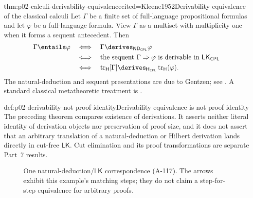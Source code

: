 \begin{hbtheorem}{thm:p02-calculi-derivability-equivalence}{cited=Kleene1952}{Derivability equivalence of the classical calculi}
Let \(\Gamma\) be a finite set of full-language propositional formulas and
let \(\varphi\) be a full-language formula.  View \(\Gamma\) as a multiset
with multiplicity one when it forms a sequent antecedent.  Then
\[
\begin{aligned}
 \Gamma\entails\varphi
 &\quad\Longleftrightarrow\quad
 \Gamma\derives_{\mathsf{ND}_{\mathsf{CPL}}}\varphi\\
 &\quad\Longleftrightarrow\quad
 \text{the sequent }\Gamma\Rightarrow\varphi
   \text{ is derivable in }\mathsf{LK}_{\mathsf{CPL}}\\
 &\quad\Longleftrightarrow\quad
 \operatorname{tr}_{\mathsf H}[\Gamma]
   \derives_{\mathsf H_{\mathsf{CPL}}}
   \operatorname{tr}_{\mathsf H}(\varphi).
\end{aligned}
\]
The natural-deduction and sequent presentations are due to Gentzen; see
\cite{Gentzen1934a}.  A standard classical metatheoretic treatment is
\cite{Kleene1952}.
\end{hbtheorem}

\begin{hbwarning}{def:p02-derivability-not-proof-identity}{Derivability equivalence is not proof identity}
The preceding theorem compares existence of derivations.  It asserts neither
literal identity of derivation objects nor preservation of proof size, and it
does not assert that an arbitrary translation of a natural-deduction or
Hilbert derivation lands directly in cut-free \(\mathsf{LK}\).  Cut
elimination and its proof transformations are separate Part~7 results.
\end{hbwarning}

\begin{figure}[htbp]
\centering
{}
\caption{One natural-deduction/\(\mathsf{LK}\) correspondence (A-117).
The arrows exhibit this example's matching steps; they do not claim a
step-for-step equivalence for arbitrary proofs.}
\label{fig:p02-nd-lk-correspondence}
\end{figure}

